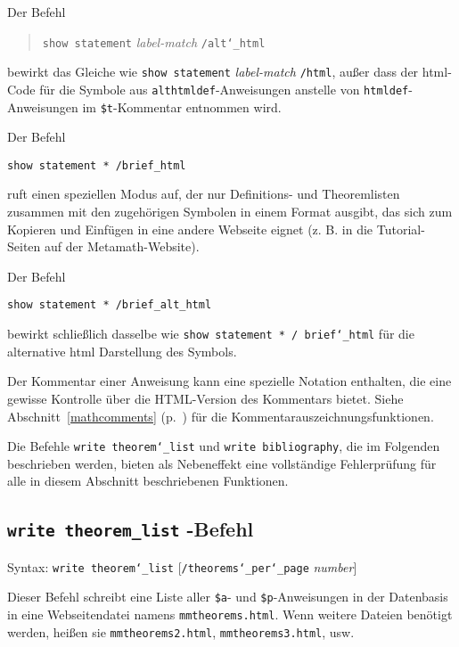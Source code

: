 Der Befehl 
\begin{quote}
\texttt{show statement} {\em label-match} \texttt{/alt{\char`\_}html}
\end{quote}
bewirkt das Gleiche wie \texttt{show statement} {\em label-match} \texttt{/html}, außer dass der {\sc html}-Code für die Symbole aus \texttt{althtmldef}-Anweisungen anstelle von \texttt{htmldef}-Anweisungen im \texttt{\$t}-Kommentar entnommen wird. 

Der Befehl 
\begin{verbatim} 
show statement * /brief_html 
\end{verbatim} 
ruft einen speziellen Modus auf, der nur Definitions- und Theoremlisten zusammen mit den zugehörigen Symbolen in einem Format ausgibt, das sich zum Kopieren und Einfügen in eine andere Webseite eignet (z. B. in die Tutorial-Seiten auf der Metamath-Website). 

Der Befehl 
\begin{verbatim}
show statement * /brief_alt_html 
\end{verbatim}
bewirkt schließlich dasselbe wie \texttt{show statement * / brief{\char`\_}html} für die alternative {\sc html} Darstellung des Symbols. 

Der Kommentar einer Anweisung kann eine spezielle Notation enthalten, die eine gewisse Kontrolle über die {\sc HTML}-Version des Kommentars bietet.  Siehe Abschnitt~\ref{mathcomments} (p.~\pageref{mathcomments}) für die Kommentarauszeichnungsfunktionen. 

Die Befehle \texttt{write theorem{\char`\_}list} und \texttt{write bibliography}, die im Folgenden beschrieben werden, bieten als Nebeneffekt eine vollständige Fehlerprüfung für alle in diesem Abschnitt beschriebenen Funktionen. 

\subsection{\texttt{write theorem\_list}
-Befehl}

Syntax:  \texttt{write theorem{\char`\_}list}
[\texttt{/theorems{\char`\_}per{\char`\_}page} {\em number}]

Dieser Befehl schreibt eine Liste aller \texttt{\$a}- und \texttt{\$p}-Anweisungen in der Datenbasis in eine Webseitendatei namens \texttt{mmtheorems.html}. Wenn weitere Dateien benötigt werden, heißen sie \texttt{mmtheorems2.html}, \texttt{mmtheorems3.html}, usw. 

